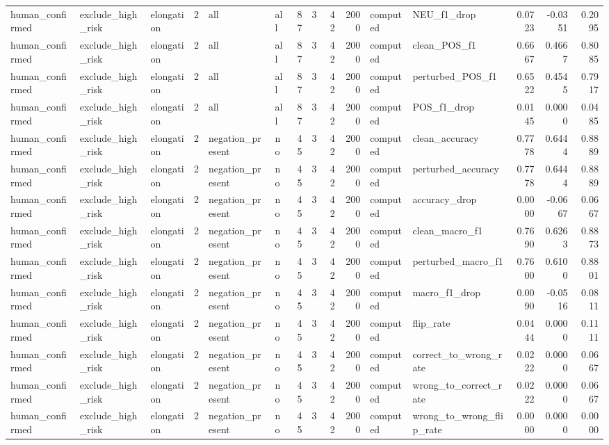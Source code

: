 \begin{tabular}{lllrllrrrrllrrr}
human_confirmed & exclude_high_risk & elongation & 2 & all & all & 87 & 3 & 42 & 2000 & computed & NEU_f1_drop & 0.0723 & -0.0351 & 0.2095 \\
human_confirmed & exclude_high_risk & elongation & 2 & all & all & 87 & 3 & 42 & 2000 & computed & clean_POS_f1 & 0.6667 & 0.4667 & 0.8085 \\
human_confirmed & exclude_high_risk & elongation & 2 & all & all & 87 & 3 & 42 & 2000 & computed & perturbed_POS_f1 & 0.6522 & 0.4545 & 0.7917 \\
human_confirmed & exclude_high_risk & elongation & 2 & all & all & 87 & 3 & 42 & 2000 & computed & POS_f1_drop & 0.0145 & 0.0000 & 0.0485 \\
human_confirmed & exclude_high_risk & elongation & 2 & negation_present & no & 45 & 3 & 42 & 2000 & computed & clean_accuracy & 0.7778 & 0.6444 & 0.8889 \\
human_confirmed & exclude_high_risk & elongation & 2 & negation_present & no & 45 & 3 & 42 & 2000 & computed & perturbed_accuracy & 0.7778 & 0.6444 & 0.8889 \\
human_confirmed & exclude_high_risk & elongation & 2 & negation_present & no & 45 & 3 & 42 & 2000 & computed & accuracy_drop & 0.0000 & -0.0667 & 0.0667 \\
human_confirmed & exclude_high_risk & elongation & 2 & negation_present & no & 45 & 3 & 42 & 2000 & computed & clean_macro_f1 & 0.7690 & 0.6263 & 0.8873 \\
human_confirmed & exclude_high_risk & elongation & 2 & negation_present & no & 45 & 3 & 42 & 2000 & computed & perturbed_macro_f1 & 0.7600 & 0.6100 & 0.8801 \\
human_confirmed & exclude_high_risk & elongation & 2 & negation_present & no & 45 & 3 & 42 & 2000 & computed & macro_f1_drop & 0.0090 & -0.0516 & 0.0811 \\
human_confirmed & exclude_high_risk & elongation & 2 & negation_present & no & 45 & 3 & 42 & 2000 & computed & flip_rate & 0.0444 & 0.0000 & 0.1111 \\
human_confirmed & exclude_high_risk & elongation & 2 & negation_present & no & 45 & 3 & 42 & 2000 & computed & correct_to_wrong_rate & 0.0222 & 0.0000 & 0.0667 \\
human_confirmed & exclude_high_risk & elongation & 2 & negation_present & no & 45 & 3 & 42 & 2000 & computed & wrong_to_correct_rate & 0.0222 & 0.0000 & 0.0667 \\
human_confirmed & exclude_high_risk & elongation & 2 & negation_present & no & 45 & 3 & 42 & 2000 & computed & wrong_to_wrong_flip_rate & 0.0000 & 0.0000 & 0.0000 \\

\end{tabular}
